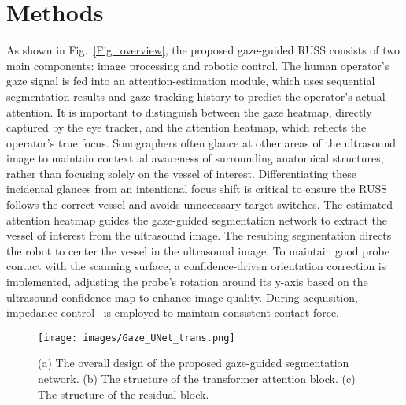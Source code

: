 
\section{Methods}
As shown in Fig.~\ref{Fig_overview}, the proposed gaze-guided RUSS consists of two main components: image processing and robotic control. The human operator’s gaze signal is fed into an attention-estimation module, which uses sequential segmentation results and gaze tracking history to predict the operator's actual attention. It is important to distinguish between the gaze heatmap, directly captured by the eye tracker, and the attention heatmap, which reflects the operator's true focus.
Sonographers often glance at other areas of the ultrasound image to maintain contextual awareness of surrounding anatomical structures, rather than focusing solely on the vessel of interest. Differentiating these incidental glances from an intentional focus shift is critical to ensure the RUSS follows the correct vessel and avoids unnecessary target switches.
The estimated attention heatmap guides the gaze-guided segmentation network to extract the vessel of interest from the ultrasound image. The resulting segmentation directs the robot to center the vessel in the ultrasound image. To maintain good probe contact with the scanning surface, a confidence-driven orientation correction is implemented, adjusting the probe’s rotation around its y-axis based on the ultrasound confidence map to enhance image quality. During acquisition, impedance control~\cite{jiang2021autonomous} is employed to maintain consistent contact force.

\begin{figure*}[ht!]
\centering
\texttt{[image: images/Gaze\_UNet\_trans.png]}
\caption{(a) The overall design of the proposed gaze-guided segmentation network. (b) The structure of the transformer attention block. (c) The structure of the residual block.
}
\label{Fig_segmentation}
\end{figure*}

